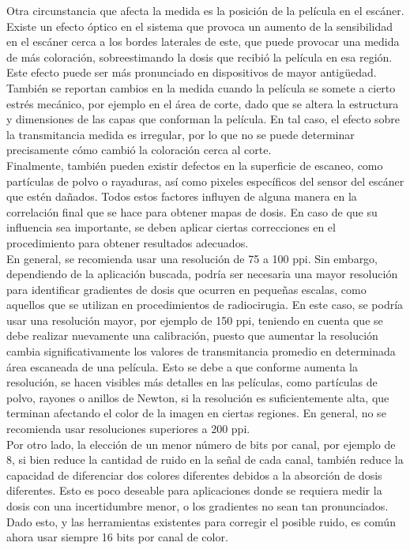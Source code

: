 Otra circunstancia que afecta la medida es la posición de la película en el escáner. Existe un efecto óptico en el sistema que provoca un aumento de la sensibilidad en el escáner cerca a los bordes laterales de este, que puede provocar una medida de más coloración, sobreestimando la dosis que recibió la película en esa región. Este efecto puede ser más pronunciado en dispositivos de mayor antigüedad.\\

También se reportan cambios en la medida cuando la película se somete a cierto estrés mecánico\cite{Yu2006}, por ejemplo en el área de corte, dado que se altera la estructura y dimensiones de las capas que conforman la película. En tal caso, el efecto sobre la transmitancia medida es irregular, por lo que no se puede determinar precisamente cómo cambió la coloración cerca al corte.\\

Finalmente, también pueden existir defectos en la superficie de escaneo, como partículas de polvo o rayaduras, así como pixeles específicos del sensor del escáner que estén dañados. Todos estos factores influyen de alguna manera en la correlación final que se hace para obtener mapas de dosis. En caso de que su influencia sea importante, se deben aplicar ciertas correcciones en el procedimiento para obtener resultados adecuados.\\

En general, se recomienda usar una resolución de 75 a 100 ppi\cite{Devic2016}. Sin embargo, dependiendo de la aplicación buscada, podría ser necesaria una mayor resolución para identificar gradientes de dosis que ocurren en pequeñas escalas, como aquellos que se utilizan en procedimientos de radiocirugia. En este caso, se podría usar una resolución mayor, por ejemplo de 150 ppi, teniendo en cuenta que se debe realizar nuevamente una calibración, puesto que aumentar la resolución cambia significativamente los valores de transmitancia promedio en determinada área escaneada de una película. Esto se debe a que conforme aumenta la resolución, se hacen visibles más detalles en las películas, como partículas de polvo, rayones o anillos de Newton, si la resolución es suficientemente alta, que terminan afectando el color de la imagen en ciertas regiones. En general, no se recomienda usar resoluciones superiores a 200 ppi.\cite{Devic2016}\\


Por otro lado, la elección de un menor número de bits por canal, por ejemplo de 8, si bien reduce la cantidad de ruido en la señal de cada canal, también reduce la capacidad de diferenciar dos colores diferentes debidos a la absorción de dosis diferentes. Esto es poco deseable para aplicaciones donde se requiera medir la dosis con una incertidumbre menor, o los gradientes no sean tan pronunciados. Dado esto, y las herramientas existentes para corregir el posible ruido, es común ahora usar siempre 16 bits por canal de color.\\

